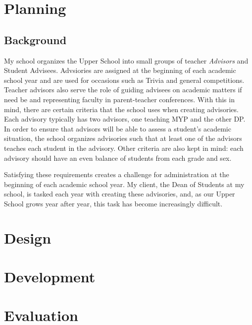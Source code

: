 \documentclass{paper}
\begin{document}
\insertTitlePage
{}
\tableofcontents
\thispagestyle{frontorback}
\newpage
\setcounter{page}{1}
\justifying

\section{Planning}
\label{sec:planning}
\subsection{Background}
My school organizes the Upper School into small groups of teacher \textit{Advisors} and Student Advisees.
Advsiories are assigned at the beginning of each academic school year and are used for occasions such as Trivia and general competitions.
Teacher advisors also serve the role of guiding advisees on academic matters if need be and representing faculty in parent-teacher conferences.
With this in mind, there are certain criteria that the school uses when creating advisories.
Each advisory typically has two advisors, one teaching MYP and the other DP.
In order to ensure that advisors will be able to assess a student's academic situation, the school organizes advisories such that at least one of the advisors teaches each student in the advisory.
Other criteria are also kept in mind: each advisory should have an even balance of students from each grade and sex.

Satisfying these requirements creates a challenge for administration at the beginning of each academic school year.
My client, the Dean of Students at my school, is tasked each year with creating these advisories, and, as our Upper School grows year after year, this task has become increasingly difficult.

\section{Design}
\label{sec:design}

\section{Development}
\label{sec:develop}

\section{Evaluation}
\label{sec:eval}

\label{mylastpage}
%
\newpage
{}
\listoffigures
\vspace{1cm}
\listofsnippets
\vspace{1cm}
{}
\printbibliography
\thispagestyle{frontorback}
\end{document}
